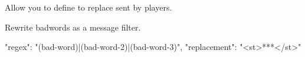 \label{ch:chat_rewrite}
Allow you to define  to replace  sent by players.


\begin{example}{Rewrite badwords as a message filter.}
    \begin{jsoncode}
    {
        "regex": "(bad-word)|(bad-word-2)|(bad-word-3)",
        "replacement": "<st>***</st>"
    }
    \end{jsoncode}
\end{example}
